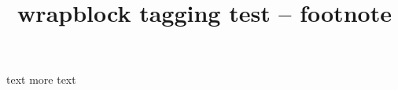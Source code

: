 \documentclass{article}
\title{wrapblock tagging test -- footnote}
\begin{document}
\kant[1]
\begin{wrapblock}{text\footnotemark}
\kant[2-3]
more text
\end{wrapblock}
\kant[4]
\end{document}
